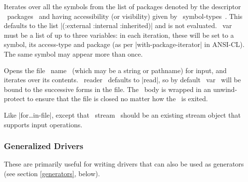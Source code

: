 \begin{clauses}
Iterates over all the symbols from the list of packages denoted by the
descriptor ~packages~ and having accessibility (or visibility) given by
~symbol-types~.  This defaults to the list |(:external :internal :inherited)|
and is not evaluated.  ~var~ must be a list of up to three variables: in each
iteration, these will be set to a symbol, its access-type and package (as per
|with-package-iterator| in ANSI-CL).  The same symbol may appear more than
once.

\end{clauses}

\begin{clauses}

Opens the file ~name~ (which may be a string or pathname) for input,
and iterates
over its contents. ~reader~ defaults to |read|, so by default ~var~
will be bound to the successive forms in the file.  The \iter\ body is
wrapped in an unwind-protect to ensure that the file is closed no
matter how the \iter\ is exited.

Like |for\dots in-file|, except that ~stream~ should be an existing
stream object that supports input operations.

\end{clauses}

\subsubsection{Generalized Drivers}

These are primarily useful for writing drivers that can also be used
as generators (see section \ref{generators}, below).

